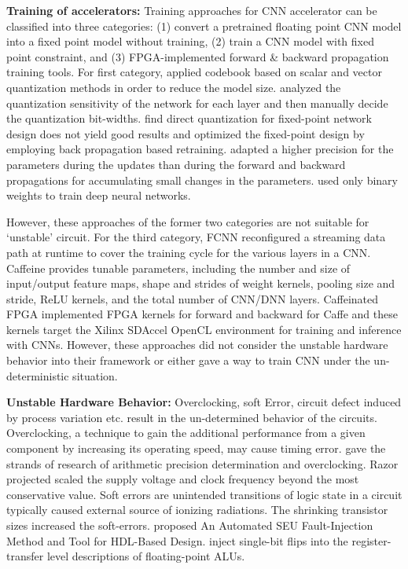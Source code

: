 \textbf{Training of accelerators:} Training approaches for CNN accelerator can be classified into three 
categories: (1) convert a pretrained floating point CNN model into a fixed point model without 
training, (2) train a CNN model with fixed point constraint, and (3) FPGA-implemented forward \& backward propagation 
training tools. For first category, \cite{Yunchao_19} applied codebook based on scalar and vector quantization methods 
in order to reduce the model size. \cite{Cnvlutin_25} analyzed the quantization sensitivity of the network for each layer 
and then manually decide the quantization bit-widths. \cite{Hwang2014_17} find direct quantization for fixed-point 
network design does not yield good results and optimized the fixed-point design by employing back propagation 
based retraining. \cite{Matthieu2014_8} adapted a higher precision for the parameters during the updates than during 
the forward and backward propagations for accumulating small changes in the parameters. \cite{Hwang2014_17} used only binary 
weights to train deep neural networks. 

  However, these approaches of the former two categories are not suitable for ‘unstable’ circuit. 
For the third category, FCNN\cite{fcnn_5}  reconfigured a streaming data path at runtime to cover the training cycle 
for the various layers in a CNN. Caffeine\cite{Caffeine_6}  provides tunable parameters, including the number and 
size of input/output feature maps, shape and strides of weight kernels, pooling size and stride, 
ReLU kernels, and the total number of CNN/DNN layers. Caffeinated FPGA\cite{DiCecco_4} implemented FPGA kernels 
for forward and backward for Caffe and these kernels target the Xilinx SDAccel OpenCL environment 
for training and inference with CNNs. However, these approaches did not consider the unstable 
hardware behavior into their framework or either gave a way to train CNN under the un-deterministic situation.

\textbf{Unstable Hardware Behavior:} Overclocking, soft Error, circuit defect induced by process 
variation etc. result in the un-determined behavior of the circuits.  Overclocking, a technique to gain 
the additional performance from a given component by increasing its operating speed, may cause timing error. \cite{overclock_3} gave 
the strands of research of arithmetic precision determination and overclocking. Razor\cite{Razor_15}  projected scaled 
the supply voltage and clock frequency beyond the most conservative value. Soft errors are unintended 
transitions of logic state in a circuit typically caused external source of ionizing radiations. 
The shrinking transistor sizes increased the soft-errors. \cite{Mansour_20} proposed An Automated SEU 
Fault-Injection Method and Tool for HDL-Based Design. \cite{Subasi_30} inject single-bit flips into the register-transfer 
level descriptions of floating-point ALUs.


